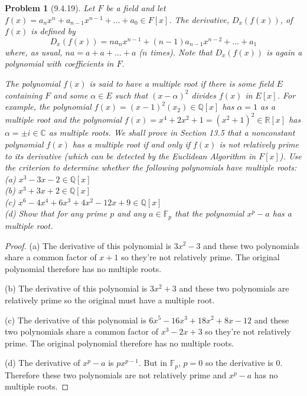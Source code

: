 \documentclass{article}
\newtheorem{problem}{Problem}
\begin{document}
\begin{problem}[9.4.19]
Let $F$ be a field and let $f(x) = a_nx^n + a_{n-1}x^{n-1} + \dots + a_0 \in F[x]$. The \emph{derivative}, $D_x(f(x))$, of $f(x)$ is defined by
\[
D_x(f(x)) = na_nx^{n-1} + (n-1)a_{n-1}x^{n-2} + \dots + a_1
\]
where, as usual, $na = a + a + \dots + a$ ($n$ times). Note that $D_x(f(x))$ is again a polynomial with coefficients in $F$.

The polynomial $f(x)$ is said to have a \emph{multiple root} if there is some field $E$ containing $F$ and some $\alpha \in E$ such that $(x-\alpha)^2$ divides $f(x)$ in $E[x]$. For example, the polynomial $f(x) = (x-1)^2(x_2) \in \mathbb{Q}[x]$ has $\alpha = 1$ as a multiple root and the polynomial $f(x) = x^4 + 2x^2 + 1 = (x^2 + 1)^2 \in \mathbb{R}[x]$ has $\alpha = \pm i \in \mathbb{C}$ as multiple roots. We shall prove in Section 13.5 that a nonconstant polynomial $f(x)$ has a multiple root if and only if $f(x)$ is not relatively prime to its derivative (which can be detected by the Euclidean Algorithm in $F[x]$). Use the criterion to determine whether the following polynomials have multiple roots:\\
(a) $x^3 - 3x - 2 \in \mathbb{Q}[x]$\\
(b) $x^3 + 3x + 2 \in \mathbb{Q}[x]$\\
(c) $x^6 - 4x^4 + 6x^3 + 4x^2 - 12x + 9 \in \mathbb{Q}[x]$\\
(d) Show that for any prime $p$ and any $a \in \mathbb{F}_p$ that the polynomial $x^p - a$ has a multiple root.
\end{problem}
\begin{proof}
(a) The derivative of this polynomial is $3x^2 - 3$ and these two polynomials share a common factor of $x+1$ so they're not relatively prime. The original polynomial therefore has no multiple roots.

(b) The derivative of this polynomial is $3x^2 + 3$ and these two polynomials are relatively prime so the original must have a multiple root.

(c) The derivative of this polynomial is $6x^5 - 16x^3 + 18x^2 + 8x - 12$ and these two polynomials share a common factor of $x^3 - 2x + 3$ so they're not relatively prime. The original polynomial therefore has no multiple roots.

(d) The derivative of $x^p - a$ is $px^{p-1}$. But in $\mathbb{F}_p$, $p = 0$ so the derivative is $0$. Therefore these two polynomials are not relatively prime and $x^p - a$ has no multiple roots.
\end{proof}
\end{document}
